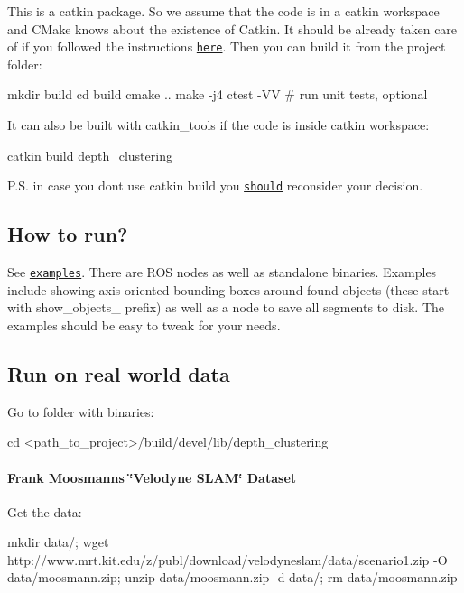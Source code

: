 This is a catkin package. So we assume that the code is in a catkin workspace and C\+Make knows about the existence of Catkin. It should be already taken care of if you followed the instructions \href{#set-up-workspace-and-catkin}{\tt here}. Then you can build it from the project folder\+:


\begin{DoxyCode}
mkdir build
cd build
cmake ..
make -j4
ctest -VV  # run unit tests, optional
\end{DoxyCode}


It can also be built with {\ttfamily catkin\+\_\+tools} if the code is inside catkin workspace\+:


\begin{DoxyCode}
catkin build depth\_clustering
\end{DoxyCode}


P.\+S. in case you don\textquotesingle{}t use {\ttfamily catkin build} you \href{https://catkin-tools.readthedocs.io/en/latest/installing.html}{\tt should} reconsider your decision.

\subsection*{How to run?}

See \href{examples/}{\tt examples}. There are R\+OS nodes as well as standalone binaries. Examples include showing axis oriented bounding boxes around found objects (these start with {\ttfamily show\+\_\+objects\+\_\+} prefix) as well as a node to save all segments to disk. The examples should be easy to tweak for your needs.

\subsection*{Run on real world data}

Go to folder with binaries\+: 
\begin{DoxyCode}
cd <path\_to\_project>/build/devel/lib/depth\_clustering
\end{DoxyCode}


\paragraph*{Frank Moosmann\textquotesingle{}s \char`\"{}\+Velodyne S\+L\+A\+M\char`\"{} Dataset}

Get the data\+: 
\begin{DoxyCode}
mkdir data/; wget http://www.mrt.kit.edu/z/publ/download/velodyneslam/data/scenario1.zip -O
       data/moosmann.zip; unzip data/moosmann.zip -d data/; rm data/moosmann.zip
\end{DoxyCode}


